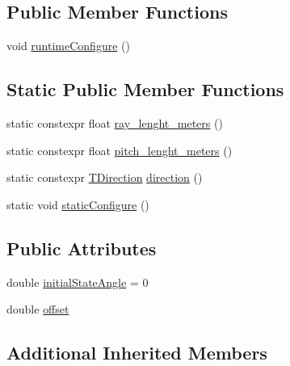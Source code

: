 \subsection*{Public Member Functions}
\begin{DoxyCompactItemize}
\item 
void \hyperlink{structsm__dance__bot__strikes__back_1_1SS4_1_1SsFPattern1_a375b810a59d5791789a249e1904b54f3}{runtime\+Configure} ()
\end{DoxyCompactItemize}
\subsection*{Static Public Member Functions}
\begin{DoxyCompactItemize}
\item 
static constexpr float \hyperlink{structsm__dance__bot__strikes__back_1_1SS4_1_1SsFPattern1_a42e955dfd91252f0785b5e2d28ed5f18}{ray\+\_\+lenght\+\_\+meters} ()
\item 
static constexpr float \hyperlink{structsm__dance__bot__strikes__back_1_1SS4_1_1SsFPattern1_ab98454c837f0c7f01ab14ac30bce718e}{pitch\+\_\+lenght\+\_\+meters} ()
\item 
static constexpr \hyperlink{namespacesm__dance__bot__strikes__back_1_1f__pattern__states_a606b9ab33830b5491413ff90dc1ea1ac}{T\+Direction} \hyperlink{structsm__dance__bot__strikes__back_1_1SS4_1_1SsFPattern1_a268a3bbf45517f3d39de2f81a925bd99}{direction} ()
\item 
static void \hyperlink{structsm__dance__bot__strikes__back_1_1SS4_1_1SsFPattern1_a331cd5ebbb578ed54a7810b957ee5820}{static\+Configure} ()
\end{DoxyCompactItemize}
\subsection*{Public Attributes}
\begin{DoxyCompactItemize}
\item 
double \hyperlink{structsm__dance__bot__strikes__back_1_1SS4_1_1SsFPattern1_a94fb541a6463c594e75459f61583a966}{initial\+State\+Angle} = 0
\item 
double \hyperlink{structsm__dance__bot__strikes__back_1_1SS4_1_1SsFPattern1_ab149ca1fffb4c5dcf749234d0e89ad40}{offset}
\end{DoxyCompactItemize}
\subsection*{Additional Inherited Members}


